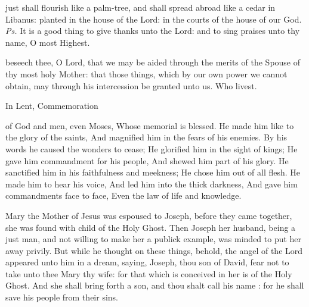 
\introit
{} just shall flourish like a palm-tree, and shall spread abroad like a cedar in Libanus: planted in the house of the Lord: in the courts of the house of our God. \textit{Ps.} It is a good thing to give thanks unto the Lord: and to sing praises unto thy name, O most Highest.

\collect
{} beseech thee, O Lord, that we may be aided through the merits of the Spouse of thy most holy Mother: that those things, which by our own power we cannot obtain, may through his intercession be granted unto us. Who livest.
\begin{rubric}
    In Lent, Commemoration 
\end{rubric}

 of God and men, even Moses, Whose memorial is blessed. He made him like to the glory of the saints, And magnified him in the fears of his enemies. By his words he caused the wonders to cease; He glorified him in the sight of kings; He gave him commandment for his people, And shewed him part of his glory. He sanctified him in his faithfulness and meekness; He chose him out of all flesh. He made him to hear his voice, And led him into the thick darkness, And gave him commandments face to face, Even the law of life and knowledge.


{}
 Mary the Mother of Jesus was espoused to Joseph, before they came together, she was found with child of the Holy Ghost. Then Joseph her husband, being a just man, and not willing to make her a publick example, was minded to put her away privily. But while he thought on these things, behold, the angel of the Lord appeared unto him in a dream, saying, Joseph, thou son of David, fear not to take unto thee Mary thy wife: for that which is conceived in her is of the Holy Ghost. And she shall bring forth a son, and thou shalt call his name : for he shall save his people from their sins.

